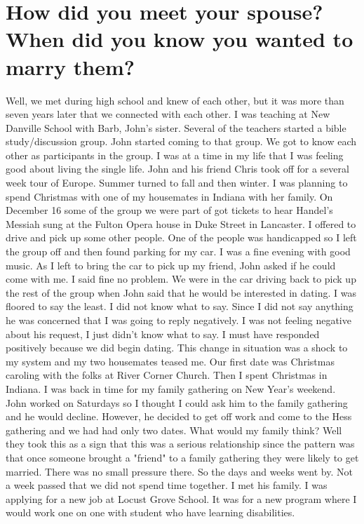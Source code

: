 \section{How did you meet your spouse? When did you know you wanted to marry them?}
Well, we met during high school and knew of each other, but it was more than seven years later that we connected with each other.
I was teaching at New Danville School with Barb, John's sister.
Several of the teachers started a bible study/discussion group.
John started coming to that group.
We got to know each other as participants in the group.
I was at a time in my life that I was feeling good about living the single life.
John and his friend Chris took off for a several week tour of Europe.
Summer turned to fall and then winter.
I was planning to spend Christmas with one of my housemates in Indiana with her family.
On December 16 some of the group we were part of got tickets to hear Handel's Messiah sung at the Fulton Opera house in Duke Street in Lancaster.
I offered to drive and pick up some other people.
One of the people was handicapped so I left the group off and then found parking for my car.
I was a fine evening with good music.
As I left to bring the car to pick up my friend, John asked if he could come with me.
I said fine no problem.
We were in the car driving back to pick up the rest of the group when John said that he would be interested in dating.
I was floored to say the least.
I did not know what to say.
Since I did not say anything he was concerned that I was going to reply negatively.
I was not feeling negative about his request, I just didn't know what to say.
I must have responded positively because we did begin dating.
This change in situation was a shock to my system and my two housemates teased me.
Our first date was Christmas caroling with the folks at River Corner Church.
Then I spent Christmas in Indiana.
I was back in time for my family gathering on New Year's weekend.
John worked on Saturdays so I thought I could ask him to the family gathering and he would decline.
However, he decided to get off work and come to the Hess gathering and we had had only two dates.
What would my family think?
Well they took this as a sign that this was a serious relationship since the pattern was that once someone brought a "friend" to a family gathering they were likely to get married.
There was no small pressure there.
So the days and weeks went by.
Not a week passed that we did not spend time together.
I met his family.
I was applying for a new job at Locust Grove School.
It was for a new program where I would work one on one with student who have learning disabilities.
